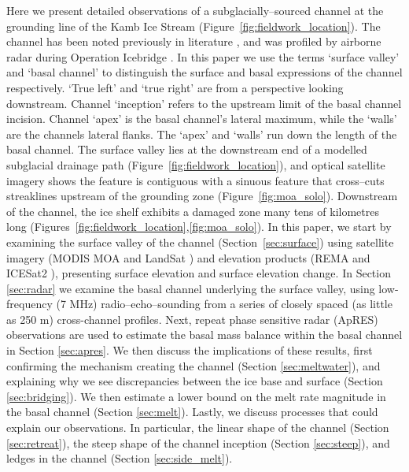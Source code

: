 Here we present detailed observations of a subglacially--sourced channel at the grounding line of the Kamb Ice Stream (Figure~\ref{fig:fieldwork_location}). The channel has been noted previously in literature \citep{alley2016impacts,kim2016active,goeller2015subglacial,horgan2017poststagnation}, and was profiled by airborne radar during Operation Icebridge \citep{studinger2010operation}. In this paper we use the terms `surface valley' and `basal channel' to distinguish the surface and basal expressions of the channel respectively. `True left' and `true right' are from a perspective looking downstream. Channel `inception' refers to the upstream limit of the basal channel incision. Channel `apex' is the basal channel's lateral maximum, while the `walls' are the channels lateral flanks. The `apex' and `walls' run down the length of the basal channel.  The surface valley lies at the downstream end of a modelled subglacial drainage path (Figure~\ref{fig:fieldwork_location}), and optical satellite imagery shows the feature is contiguous with a sinuous feature that cross--cuts streaklines upstream of the grounding zone (Figure~\ref{fig:moa_solo}). Downstream of the channel, the ice shelf exhibits a damaged zone many tens of kilometres long (Figures~\ref{fig:fieldwork_location},\ref{fig:moa_solo}).
In this paper, we start by examining the surface valley of the channel (Section~\ref{sec:surface}) using satellite imagery (MODIS MOA \citep{haran2014modis} and LandSat \citep{RoyLandsat8Scienceproduct2014}) and elevation products (REMA \citep{howat2019reference} and ICESat2 \citep{smith2021v3}), presenting surface elevation and surface elevation change. 
In Section \ref{sec:radar} we examine the basal channel underlying the surface valley, using low-frequency (7 MHz) radio--echo--sounding from a series of closely spaced (as little as 250 m) cross-channel profiles. Next, repeat phase sensitive radar (ApRES) observations are used to estimate the basal mass balance within the basal channel in Section \ref{sec:apres}.
We then discuss the implications of these results, first confirming the mechanism creating the channel (Section \ref{sec:meltwater}), and explaining why we see discrepancies between the ice base and surface (Section \ref{sec:bridging}). We then estimate a lower bound on the melt rate magnitude in the basal channel (Section \ref{sec:melt}). 
Lastly, we discuss processes that could explain our observations. In particular, the linear shape of the channel (Section \ref{sec:retreat}), the steep shape of the channel inception (Section \ref{sec:steep}), and ledges in the channel (Section \ref{sec:side_melt}).

